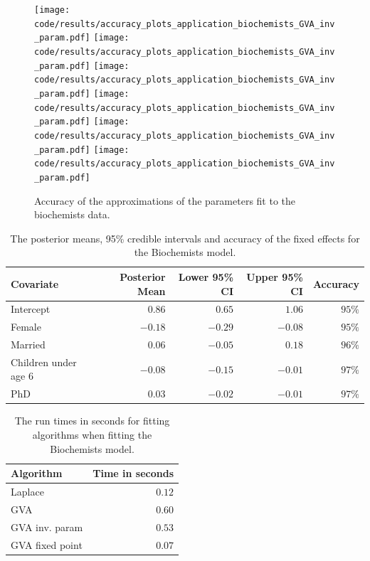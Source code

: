 \begin{figure}[h]
\centering
	\texttt{[image: code/results/accuracy\_plots\_application\_biochemists\_GVA\_inv\_param.pdf]}
	\texttt{[image: code/results/accuracy\_plots\_application\_biochemists\_GVA\_inv\_param.pdf]}
	\texttt{[image: code/results/accuracy\_plots\_application\_biochemists\_GVA\_inv\_param.pdf]}
	\texttt{[image: code/results/accuracy\_plots\_application\_biochemists\_GVA\_inv\_param.pdf]}
	\texttt{[image: code/results/accuracy\_plots\_application\_biochemists\_GVA\_inv\_param.pdf]}
	\texttt{[image: code/results/accuracy\_plots\_application\_biochemists\_GVA\_inv\_param.pdf]}
\label{fig:biochemists}
\caption{Accuracy of the approximations of the parameters fit to the biochemists data.}
\end{figure}

\begin{table}
	{\footnotesize 
	\begin{tabular}{|l|rrrr|}
		\hline
		Covariate          & Posterior Mean & Lower 95\% CI & Upper 95\% CI & Accuracy \\
		\hline
		Intercept & $0.86$ & $0.65$ & $1.06$ &  $95\%$ \\
		Female & $-0.18$ & $-0.29$ & $-0.08$ &  $95\%$ \\
		Married & $0.06$ & $-0.05$ & $0.18$ & $96\%$ \\
		Children under age 6 & $-0.08$ & $-0.15$ & $-0.01$ & $97\%$ \\
		PhD & $0.03$ & $-0.02$ & $-0.01$ & $97\%$ \\
		\hline
	\end{tabular}
}			
	\label{tab:biochemists_results}\bigskip
	\caption{The posterior means, 95\% credible intervals and accuracy of the fixed effects for the 
						Biochemists model.}
\end{table}

\begin{table}
	{\footnotesize
	\begin{tabular}{|l|r|}
	\hline
	Algorithm & Time in seconds \\
	\hline
	Laplace & $0.12$ \\
	GVA & $0.60$ \\
	GVA inv. param & $0.53$ \\
	GVA fixed point & $0.07$ \\
	\hline
	\end{tabular}
}
	\label{tab:biochemists_runtime}\bigskip
	\caption{The run times in seconds for fitting algorithms when fitting the Biochemists model.}
\end{table}

